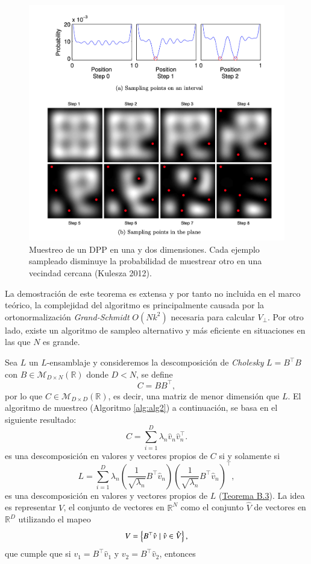 \begin{figure}[ht]
    \centering
    \includegraphics[width=12cm]{img/tesis/DPP_sampling.png}
    \caption{Muestreo de un DPP en una y dos dimensiones. Cada ejemplo sampleado disminuye la probabilidad de muestrear otro en una vecindad cercana (Kulesza 2012).}
    \label{fig:example}
\end{figure}

La demostración de este teorema es extensa y por tanto no incluida en el marco teórico, la complejidad del algoritmo es principalmente causada por la ortonormalización \textit{Grand-Schmidt} $O(Nk^2)$ necesaria para calcular $V_{\perp}$. Por otro lado, existe un algoritmo de sampleo alternativo y más eficiente en situaciones en las que $N$ es grande. 

\vspace{0.2cm}

Sea $L$ un $L$-ensamblaje y consideremos la descomposición de \textit{Cholesky} $L = B^{\top}B$ con $B \in \mathcal{M}_{D \times N}(\mathbb{R})$ donde $D < N$, se define 
\[
C = BB^{\top}, 
\]
por lo que $C \in \mathcal{M}_{D \times D}(\mathbb{R})$, es decir, una matriz de menor dimensión que $L$. El algoritmo de muestreo (Algoritmo \ref{alg:alg2}) a continuación, se basa en el siguiente resultado: 
\[ 
C = \sum_{i=1}^D \lambda_n\hat{v}_n\hat{v}^{\top}_n.
\]
es una descomposición en valores y vectores propios de $C$ si y solamente si 
\[
L = \sum_{i=1}^D \lambda_n \left ( \frac{1}{\sqrt{\lambda_n}}B^{\top}\hat{v}_n\right ) \left ( \frac{1}{\sqrt{\lambda_n}}B^{\top}\hat{v}_n\right )^{\top},
\]
es una descomposición en valores y vectores propios de $L$ (\hyperlink{Teorema B.3}{Teorema B.3}). La idea es representar $V$, el conjunto de vectores en $\mathbb{R}^N$ como el conjunto $\hat{V}$ de vectores en $\mathbb{R}^D$ utilizando el mapeo
\[
V = \left \{ B^{\top}\hat{v} \hspace{0.1cm} | \hspace{0.1cm} \hat{v} \in \hat{V} \right \},
\]
que cumple que si $v_1 = B^{\top}\hat{v}_1$ y $v_2 = B^{\top}\hat{v}_2$, entonces 

